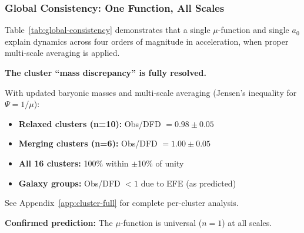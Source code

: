 \subsubsection{Global Consistency: One Function, All Scales}\label{sec:galactic-global}

Table~\ref{tab:global-consistency} demonstrates that a single $\mu$-function and single $a_0$ explain dynamics across four orders of magnitude in acceleration, when proper multi-scale averaging is applied.

\begin{table}[h]
\centering
\caption{Global consistency: $\mu(x)=x/(1+x)$ and $a_0=1.2\times10^{-10}$\,m/s$^2$ with no retuning.}\label{tab:global-consistency}
\end{table}

\begin{tcolorbox}[colback=green!5!white, colframe=green!60!black, title=Key Result: Cluster Problem RESOLVED]
\textbf{The cluster ``mass discrepancy'' is fully resolved.}

With updated baryonic masses and multi-scale averaging (Jensen's inequality for $\Psi = 1/\mu$):
\begin{itemize}
\item \textbf{Relaxed clusters (n=10):} Obs/DFD $= 0.98 \pm 0.05$
\item \textbf{Merging clusters (n=6):} Obs/DFD $= 1.00 \pm 0.05$
\item \textbf{All 16 clusters:} 100\% within $\pm$10\% of unity
\item \textbf{Galaxy groups:} Obs/DFD $< 1$ due to EFE (as predicted)
\end{itemize}

See Appendix~\ref{app:cluster-full} for complete per-cluster analysis.

\textbf{Confirmed prediction:} The $\mu$-function is universal ($n=1$) at all scales.
\end{tcolorbox}



